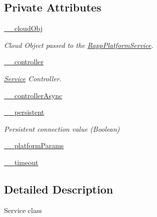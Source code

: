 \subsection*{Private Attributes}
\begin{DoxyCompactItemize}
\item 
\hyperlink{classRappCloud_1_1Service_1_1RappPlatformService_1_1RappPlatformService_a07ec5ec510ba7ce5d826e31d87425d36}{\-\_\-\-\_\-cloud\-Obj}
\begin{DoxyCompactList}\small\item\em Cloud Object passed to the \hyperlink{classRappCloud_1_1Service_1_1RappPlatformService_1_1RappPlatformService}{Rapp\-Platform\-Service}. \end{DoxyCompactList}\item 
\hyperlink{classRappCloud_1_1Service_1_1RappPlatformService_1_1RappPlatformService_ac53cac24fe1b9739f4dc7d563892122a}{\-\_\-\-\_\-controller}
\begin{DoxyCompactList}\small\item\em \hyperlink{namespaceRappCloud_1_1Service}{Service} Controller. \end{DoxyCompactList}\item 
\hyperlink{classRappCloud_1_1Service_1_1RappPlatformService_1_1RappPlatformService_a6d492a93d07ee24c1056a444a9dfc906}{\-\_\-\-\_\-controller\-Async}
\item 
\hyperlink{classRappCloud_1_1Service_1_1RappPlatformService_1_1RappPlatformService_aec1423f0b9b9a2fd4652bbf345f15395}{\-\_\-\-\_\-persistent}
\begin{DoxyCompactList}\small\item\em Persistent connection value (Boolean) \end{DoxyCompactList}\item 
\hyperlink{classRappCloud_1_1Service_1_1RappPlatformService_1_1RappPlatformService_a88c2942d52010ecd7f39b347e40ccc94}{\-\_\-\-\_\-platform\-Params}
\item 
\hyperlink{classRappCloud_1_1Service_1_1RappPlatformService_1_1RappPlatformService_a6eea6da93f15eddddb1424615e37b106}{\-\_\-\-\_\-timeout}
\end{DoxyCompactItemize}


\subsection{Detailed Description}
\begin{DoxyVerb}Service class \end{DoxyVerb}
 

